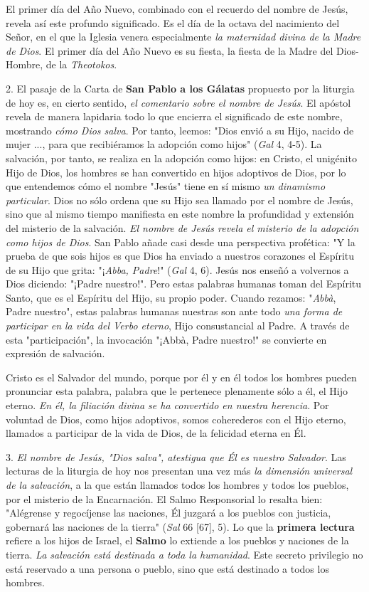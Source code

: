 \begin{body}
El primer día del Año Nuevo, combinado con el recuerdo del nombre de Jesús, revela así este profundo significado. Es el día de la octava del nacimiento del Señor, en el que la Iglesia venera especialmente \emph{la maternidad divina de la Madre de Dios}. El primer día del Año Nuevo es su fiesta, la fiesta de la Madre del Dios-Hombre, de la \emph{Theotokos}.

2. El pasaje de la Carta de \textbf{San Pablo a los Gálatas} propuesto por la liturgia de hoy es, en cierto sentido, \emph{el comentario sobre el nombre de Jesús}. El apóstol revela de manera lapidaria todo lo que encierra el significado de este nombre, mostrando \emph{cómo Dios salva}. Por tanto, leemos: "Dios envió a su Hijo, nacido de mujer ..., para que recibiéramos la adopción como hijos" (\emph{Gal} 4, 4-5). La salvación, por tanto, se realiza en la adopción como hijos: en Cristo, el unigénito Hijo de Dios, los hombres se han convertido en hijos adoptivos de Dios, por lo que entendemos cómo el nombre "Jesús" tiene en sí mismo \emph{un dinamismo particular}. Dios no sólo ordena que su Hijo sea llamado por el nombre de Jesús, sino que al mismo tiempo manifiesta en este nombre la profundidad y extensión del misterio de la salvación. \emph{El nombre de Jesús revela el misterio de la adopción como hijos de Dios}. San Pablo añade casi desde una perspectiva profética: "Y la prueba de que sois hijos es que Dios ha enviado a nuestros corazones el Espíritu de su Hijo que grita: "¡\emph{Abba, Padre}!" (\emph{Gal} 4, 6). Jesús nos enseñó a volvernos a Dios diciendo: "¡Padre nuestro!". Pero estas palabras humanas toman del Espíritu Santo, que es el Espíritu del Hijo, su propio poder. Cuando rezamos: "\emph{Abbà}, Padre nuestro", estas palabras humanas nuestras son ante todo \emph{una forma de participar en la vida del Verbo eterno}, Hijo consustancial al Padre. A través de esta "participación", la invocación "¡Abbà, Padre nuestro!" se convierte en expresión de salvación.

Cristo es el Salvador del mundo, porque por él y en él todos los hombres pueden pronunciar esta palabra, palabra que le pertenece plenamente sólo a él, el Hijo eterno. \emph{En él, la filiación divina se ha convertido en nuestra herencia}. Por voluntad de Dios, como hijos adoptivos, somos coherederos con el Hijo eterno, llamados a participar de la vida de Dios, de la felicidad eterna en Él.

3. \emph{El nombre de Jesús, "Dios salva", atestigua que Él es nuestro Salvador}. Las lecturas de la liturgia de hoy nos presentan una vez más \emph{la dimensión universal de la salvación}, a la que están llamados todos los hombres y todos los pueblos, por el misterio de la Encarnación. El Salmo Responsorial lo resalta bien: "Alégrense y regocíjense las naciones, Él juzgará a los pueblos con justicia, gobernará las naciones de la tierra" (\emph{Sal} 66 {[}67{]}, 5). Lo que la \textbf{primera lectura} refiere a los hijos de Israel, el \textbf{Salmo} lo extiende a los pueblos y naciones de la tierra. \emph{La salvación está destinada a toda la humanidad}. Este secreto privilegio no está reservado a una persona o pueblo, sino que está destinado a todos los hombres.


\end{body}
